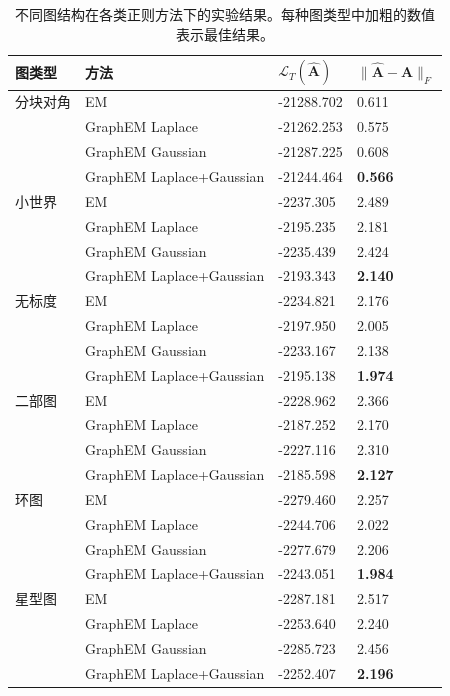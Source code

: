 \begin{table}[tb]
\centering
\caption{不同图结构在各类正则方法下的实验结果。每种图类型中加粗的数值表示最佳结果。}
\label{tab: prior results for block-diag}
\begin{tabular}{llll}
\toprule
\textbf{图类型} & \textbf{方法} & \textbf{\(\mathcal{L}_T(\widehat{\mathbf{A}})\)} & \textbf{\(\| \widehat{\mathbf{A}} - \mathbf{A} \|_F\)} \\
\midrule
分块对角 & EM & -21288.702 & 0.611 \\
 & GraphEM Laplace & -21262.253 & 0.575 \\
 & GraphEM Gaussian & -21287.225 & 0.608 \\
 & GraphEM Laplace+Gaussian & -21244.464 & \textbf{0.566} \\
小世界 & EM & -2237.305 & 2.489 \\
 & GraphEM Laplace & -2195.235 & 2.181 \\
 & GraphEM Gaussian & -2235.439 & 2.424 \\
 & GraphEM Laplace+Gaussian & -2193.343 & \textbf{2.140} \\
无标度 & EM & -2234.821 & 2.176 \\
 & GraphEM Laplace & -2197.950 & 2.005 \\
 & GraphEM Gaussian & -2233.167 & 2.138 \\
 & GraphEM Laplace+Gaussian & -2195.138 & \textbf{1.974} \\
二部图 & EM & -2228.962 & 2.366 \\
 & GraphEM Laplace & -2187.252 & 2.170 \\
 & GraphEM Gaussian & -2227.116 & 2.310 \\
 & GraphEM Laplace+Gaussian & -2185.598 & \textbf{2.127} \\
环图 & EM & -2279.460 & 2.257 \\
 & GraphEM Laplace & -2244.706 & 2.022 \\
 & GraphEM Gaussian & -2277.679 & 2.206 \\
 & GraphEM Laplace+Gaussian & -2243.051 & \textbf{1.984} \\
星型图 & EM & -2287.181 & 2.517 \\
 & GraphEM Laplace & -2253.640 & 2.240 \\
 & GraphEM Gaussian & -2285.723 & 2.456 \\
 & GraphEM Laplace+Gaussian & -2252.407 & \textbf{2.196} \\
\bottomrule
\end{tabular}
\end{table}

